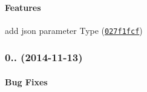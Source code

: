 {\bfseries {\bfseries {\bfseries {\bfseries \paragraph*{Features}}}}}

{\bfseries {\bfseries {\bfseries {\bfseries }}}}

{\bfseries {\bfseries {\bfseries {\bfseries 
\begin{DoxyItemize}
\item add json parameter Type (\href{https://github.com/angular-ui/ui-router/commit/027f1fcf9c0916cea651e88981345da6f9ff214a}{\tt 027f1fcf})
\end{DoxyItemize}}}}}

{\bfseries {\bfseries {\bfseries {\bfseries \label{_0.2.12}%
 \subsubsection*{0.. (2014-\/11-\/13)}}}}}

{\bfseries {\bfseries {\bfseries {\bfseries }}}}

{\bfseries {\bfseries {\bfseries {\bfseries \paragraph*{Bug Fixes}}}}}

{\bfseries {\bfseries {\bfseries {\bfseries }}}}

